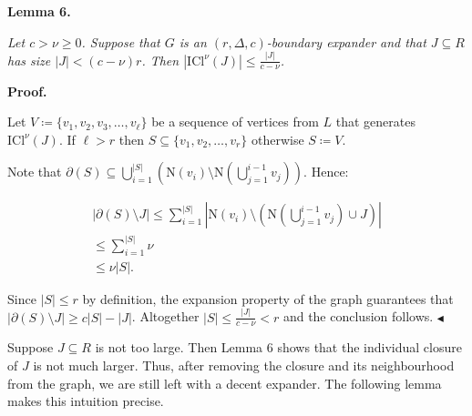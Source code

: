 \documentclass[10pt,a4paper]{article}
\begin{document}


\par\medskip\noindent\textbf{
\textbf{Lemma 6}\textbf{.}
}\par



\emph{Let $c>\nu\geq 0$. Suppose that $G$ is an $(r,\Delta,c)$-boundary expander and that $J\subseteq R$ has size $|J|<(c-\nu)r$. Then $|\mathrm{ICl}^{\nu}\left(J\right)|\leq\frac{|J|}{c-\nu}$.}\par







\par\medskip\noindent\textbf{Proof.}\par




Let $V\coloneqq\{v_{1},v_{2},v_{3},\dots,v_{\ell}\}$ be a sequence of vertices from $L$ that
generates $\mathrm{ICl}^{\nu}\left(J\right)$. If $\ell>r$ then $S\subseteq\{v_{1},v_{2},\dots,v_{r}\}$ otherwise $S\coloneqq V$.\par




Note that $\partial(S)\subseteq\bigcup\limits_{i=1}^{|S|}(\mathrm{N}\left(v_{i}\right)%
\setminus\mathrm{N}\left(\bigcup\limits_{j=1}^{i-1}v_{j}\right))$. Hence:\par


\[\begin{gathered}
\displaystyle|\partial(S)\setminus J| \displaystyle\leq\sum\limits_{i=1}^{|S|}|\mathrm{N}\left(v_{i}\right)\setminus%
(\mathrm{N}\left(\bigcup\limits_{j=1}^{i-1}v_{j}\right)\cup J)| \\
\displaystyle\leq\sum\limits_{i=1}^{|S|}\nu \\
\displaystyle\leq\nu|S|.
\end{gathered}\]




Since $|S|\leq r$ by definition, the expansion property of the graph guarantees that $|\partial(S)\setminus J|\geq c|S|-|J|$. Altogether $|S|\leq\frac{|J|}{c-\nu}<r$ and the conclusion
follows.
$\blacktriangleleft$\par




Suppose $J\subseteq R$ is not too large. Then Lemma 6 shows that the individual
closure of $J$ is not much larger. Thus, after removing the closure and its neighbourhood from the graph,
we are still left with a decent expander. The following lemma makes this intuition precise.\par
\end{document}
